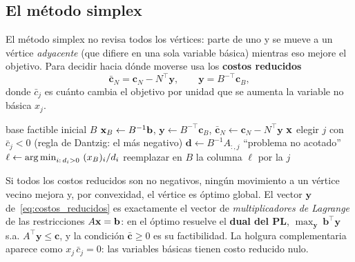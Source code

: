 \subsection{El método simplex}

El método simplex \parencite{dantzig1963} no revisa todos los vértices: parte de uno y se mueve a un vértice
\emph{adyacente} (que difiere en una sola variable básica) mientras eso mejore el objetivo. Para decidir hacia
dónde moverse usa los \textbf{costos reducidos}
\begin{equation}
  \bar{\mathbf{c}}_N = \mathbf{c}_N - N^\top\mathbf{y}, \qquad \mathbf{y} = B^{-\top}\mathbf{c}_B,
  \label{eq:costos_reducidos}
\end{equation}
donde $\bar c_j$ es cuánto cambia el objetivo por unidad que se aumenta la variable no básica $x_j$.

\begin{algorithm}[ht]
\caption{Método simplex (forma revisada, minimización).}
\label{alg:simplex}
\begin{algorithmic}[1]
\Require base factible inicial $B$
\Loop
  \State $\mathbf{x}_B \gets B^{-1}\mathbf{b}$, \quad $\mathbf{y} \gets B^{-\top}\mathbf{c}_B$, \quad $\bar{\mathbf{c}}_N \gets \mathbf{c}_N - N^\top\mathbf{y}$
    \State \Return $\mathbf{x}$ 
  \EndIf
  \State elegir $j$ con $\bar c_j < 0$ (regla de Dantzig: el más negativo) 
  \State $\mathbf{d} \gets B^{-1}A_{:,j}$ 
    \State \Return ``problema no acotado''
  \EndIf
  \State $\ell \gets \operatorname*{arg\,min}_{i:\,d_i > 0}\ (x_B)_i / d_i$ 
  \State reemplazar en $B$ la columna $\ell$ por la $j$ 
\EndLoop
\end{algorithmic}
\end{algorithm}

Si todos los costos reducidos son no negativos, ningún movimiento a un vértice vecino mejora y, por convexidad,
el vértice es óptimo global. El vector $\mathbf{y}$ de~\eqref{eq:costos_reducidos} es exactamente el vector de
\emph{multiplicadores de Lagrange} de las restricciones $A\mathbf{x} = \mathbf{b}$: en el óptimo resuelve el
\textbf{dual del PL}, $\max_{\mathbf{y}}\ \mathbf{b}^\top\mathbf{y}$ s.a. $A^\top\mathbf{y} \le \mathbf{c}$, y la condición
$\bar{\mathbf{c}} \ge 0$ es su factibilidad. La holgura complementaria aparece como $x_j\,\bar c_j = 0$: las variables
básicas tienen costo reducido nulo.

